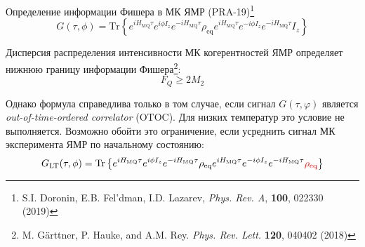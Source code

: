 \begin{frame}{Определение информации Фишера в МК ЯМР (PRA-19)\footnote{S.I. Doronin, E.B. Fel'dman,  I.D. Lazarev, \textit{Phys. Rev. A}, \textbf{100}, 022330 (2019)}}
  $$ G(\tau, \phi) =
     \mathrm{Tr}\left\{
         e^{iH_\mathrm{MQ}\tau} e^{i\phi I_z} e^{-iH_\mathrm{MQ}\tau}
         \rho_\mathrm{eq}
         e^{iH_\mathrm{MQ}\tau} e^{-i\phi I_z} e^{-iH_\mathrm{MQ}\tau}
         I_z \right\}
  $$
  \begin{alertblock}{}
      Дисперсия распределения интенсивности МК когерентностей ЯМР определяет нижнюю границу информации
      Фишера\footnote[frame]{
      M. G\"arttner, P. Hauke, and A.M. Rey. \textit{Phys. Rev. Lett.} \textbf{120}, 040402 (2018)}:
      $$
      F_Q \geq 2M_2
      $$
  \end{alertblock}
  Однако формула справедлива только в том случае,
  если сигнал $G(\tau, \varphi)$ является \textit{out-of-time-ordered correlator} (OTOC).
  Для низких температур это условие не выполняется.
  Возможно обойти это ограничение,
  если усреднить сигнал МК эксперимента ЯМР по начальному состоянию:
  $$ G_\mathrm{LT}(\tau, \phi)
     = \mathrm{Tr}\left\{
       e^{iH_\mathrm{MQ}\tau} e^{i\phi I_z} e^{-iH_\mathrm{MQ}\tau}
       \rho_\mathrm{eq}
       e^{iH_\mathrm{MQ}\tau} e^{-i\phi I_z} e^{-iH_\mathrm{MQ}\tau}
       {\color{red} \rho_\mathrm{eq}}
    \right\}
  $$
\end{frame}
